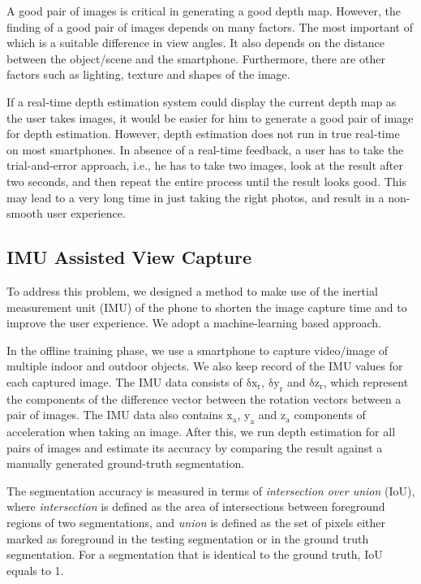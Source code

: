 A good pair of images is critical in generating a good depth map. However, the finding of a good pair of images depends on many factors. The most important of which is a suitable difference in view angles. It also depends on the distance between the object/scene and the smartphone. Furthermore, there are other factors such as lighting, texture and shapes of the image.

If a real-time depth estimation system could display the current depth map as the user takes images, it would be easier for him to generate a good pair of image for depth estimation. However, depth estimation does not run in true real-time on most smartphones. In absence of a real-time feedback, a user has to take the trial-and-error approach, i.e., he has to take two images, look at the result after two seconds, and then repeat the entire process until the result looks good. This may lead to a very long time in just taking the right photos, and result in a non-smooth user experience.

\subsection{IMU Assisted View Capture}

To address this problem, we designed a method to make use of the inertial measurement unit (IMU) of the phone to shorten the image capture time and to improve the user experience. We adopt a machine-learning based approach.

In the offline training phase, we use a smartphone to capture video/image of multiple indoor and outdoor objects. We also keep record of the IMU values for each captured image. The IMU data consists of $\mathrm{\delta x_r}$, $\mathrm{\delta y_r}$ and $\mathrm{\delta z_r}$, which represent the components of the difference vector between the rotation vectors between a pair of images. The IMU data also contains $\mathrm{x_a}$, $\mathrm{y_a}$ and $\mathrm{z_a}$ components of acceleration when taking an image. After this, we run depth estimation for all pairs of images and estimate its accuracy by comparing the result against a manually generated ground-truth segmentation.

The segmentation accuracy is measured in terms of \textit{intersection over union} (IoU), where \textit{intersection} is defined as the area of intersections between foreground regions of two segmentations, and \textit{union} is defined as the set of pixels either marked as foreground in the testing segmentation or in the ground truth segmentation. For a segmentation that is identical to the ground truth, IoU equals to 1.

